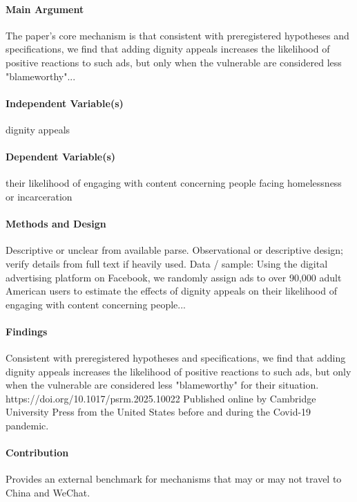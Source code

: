 \documentclass[12pt]{article}
\begin{document}
\paragraph{Main Argument} The paper's core mechanism is that consistent with preregistered hypotheses and specifications, we find that adding dignity appeals increases the likelihood of positive reactions to such ads, but only when the vulnerable are considered less "blameworthy"...

\paragraph{Independent Variable(s)} dignity appeals

\paragraph{Dependent Variable(s)} their likelihood of engaging with content concerning people facing homelessness or incarceration

\paragraph{Methods and Design} Descriptive or unclear from available parse. Observational or descriptive design; verify details from full text if heavily used. Data / sample: Using the digital advertising platform on Facebook, we randomly assign ads to over 90,000 adult American users to estimate the effects of dignity appeals on their likelihood of engaging with content concerning people...

\paragraph{Findings} Consistent with preregistered hypotheses and specifications, we find that adding dignity appeals increases the likelihood of positive reactions to such ads, but only when the vulnerable are considered less "blameworthy" for their situation. https://doi.org/10.1017/psrm.2025.10022 Published online by Cambridge University Press from the United States before and during the Covid-19 pandemic.

\paragraph{Contribution} Provides an external benchmark for mechanisms that may or may not travel to China and WeChat.
\end{document}
